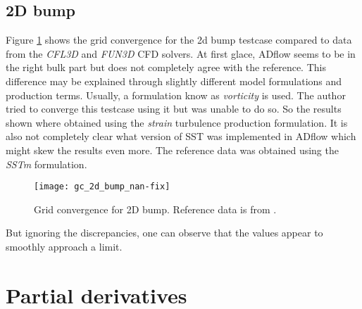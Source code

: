 \subsection{2D bump}
Figure \ref{fig:gc_2d_bump} shows the grid convergence for the 2d bump testcase
compared to data from the \textit{CFL3D} and \textit{FUN3D} CFD solvers. At
first glace, ADflow seems to be in the right bulk part but does not completely
agree with the reference. This difference may be explained through slightly
different model formulations and production terms. Usually, a formulation know
as \textit{vorticity} is used. The author tried to converge this testcase using
it but was unable to do so. So the results shown where obtained using the
\textit{strain} turbulence production formulation. It is also not completely
clear what version of SST was implemented in ADflow which might skew the
results even more. The reference data was obtained using the \textit{SSTm}
formulation. 

\begin{figure}[H] \centering
    \texttt{[image: gc\_2d\_bump\_nan-fix]}
    \caption{Grid convergence for 2D bump. Reference data is from
    \cite{nasatmr}.}
    \label{fig:gc_2d_bump}
\end{figure}

\noindent But ignoring the discrepancies, one can observe that the values
appear to smoothly approach a limit.







\section{Partial derivatives}
